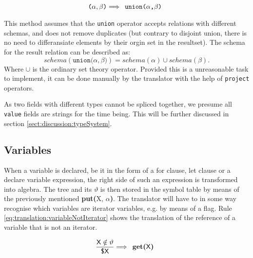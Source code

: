 \begin{equation}
\centering
\texttt{(} \alpha , \beta \texttt{)}
\Longrightarrow
\begin{array}{l}
\mbox{\texttt{union(}} 
\alpha \mbox{\texttt{,}} 
\beta \mbox{\texttt{)}}
\end{array}
\label{eq:translation:sequencing}
\end{equation}

This method assumes that the \texttt{union} operator accepts relations with
different schemas, and does not remove duplicates (but contrary to disjoint
union, there is no need to differansiate elements by their orgin set in the
resultset). The schema for the result relation can be described as:
\begin{equation*}
schema(\texttt{union(}\alpha, \beta\texttt{)}) = schema(\alpha) \cup
schema(\beta).
\end{equation*}
Where $\cup$ is the ordinary set theory operator. Provided this is a
unreasonable task to implement, it can be done manually by the translator with
the help of \texttt{project} operators.

As two fields with different types cannot be spliced together, we presume all
\texttt{value} fields are strings for the time being. This will be further
discussed in section \ref{sect:discussion:typeSystem}.

\subsection{Variables}
\label{sect:translation:variables}
When a variable is declared, be it in the form of a \textsf{for} clause, \textsf{let} clause or a \textsf{declare
variable} expression, the right side of such an expression is transformed into algebra. The tree and its
$\vartheta$ is then stored in the symbol table by means of the previously mentioned \textbf{put(}\textsf{X},
$\alpha$\textbf{)}. The translator will have to in some way recognise which variables are iterator variables, e.g.
by means of a flag. Rule \ref{eq:translation:variableNotIterator} shows the translation of the reference of a
variable that is not an iterator.

\begin{equation}
\centering
\frac{\displaystyle \textsf{X} \notin \vartheta}{\displaystyle \textsf{\$X}}
\Longrightarrow
\begin{array}{l}
	\mbox{\textbf{get(}\textsf{X}\textbf{)}}
\end{array}
\label{eq:translation:variableNotIterator}
\end{equation}

